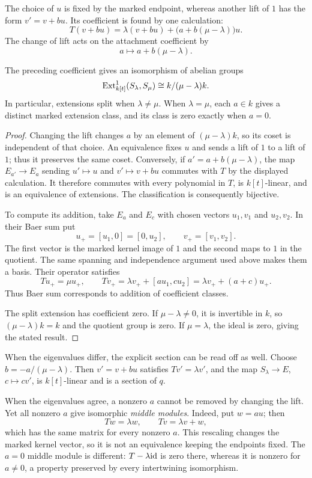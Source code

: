 The choice of $u$ is fixed by the marked endpoint, whereas another lift
of $1$ has the form $v'=v+bu$. Its coefficient is found by one calculation:
\[
T(v+bu)=\lambda(v+bu)+\bigl(a+b(\mu-\lambda)\bigr)u.
\]
The change of lift acts on the attachment coefficient by
\[
a\longmapsto a+b(\mu-\lambda).
\]

\begin{proposition}\label{x:operator-ext-classification}
The preceding coefficient gives an isomorphism of abelian groups
\[
\operatorname{Ext}^1_{k[t]}(S_\lambda,S_\mu)
 \cong k/(\mu-\lambda)k.
\]
In particular, extensions split when $\lambda\ne\mu$. When
$\lambda=\mu$, each $a\in k$ gives a distinct marked extension class,
and its class is zero exactly when $a=0$.
\end{proposition}
\begin{proof}
Changing the lift changes $a$ by an element of $(\mu-\lambda)k$, so
its coset is independent of that choice. An equivalence fixes $u$ and
sends a lift of $1$ to a lift of $1$; thus it preserves the same coset.
Conversely, if $a'=a+b(\mu-\lambda)$, the map $E_{a'}\to E_a$ sending
$u'\mapsto u$ and $v'\mapsto v+bu$ commutes with $T$ by the displayed
calculation. It therefore commutes with every polynomial in $T$, is
$k[t]$-linear, and is an equivalence of extensions. The classification
is consequently bijective.

To compute its addition, take $E_a$ and $E_c$ with chosen vectors
$u_1,v_1$ and $u_2,v_2$. In their Baer sum put
\[
u_+=[u_1,0]=[0,u_2],\qquad v_+=[v_1,v_2].
\]
The first vector is the marked kernel image of $1$ and the second maps
to $1$ in the quotient. The same spanning and independence argument
used above makes them a basis. Their operator satisfies
\[
Tu_+=\mu u_+,\qquad
Tv_+=\lambda v_++[a u_1,c u_2]
       =\lambda v_++(a+c)u_+.
\]
Thus Baer sum corresponds to addition of coefficient classes.

The split extension has coefficient zero. If $\mu-\lambda\ne0$, it
is invertible in $k$, so $(\mu-\lambda)k=k$ and the quotient group is
zero. If $\mu=\lambda$, the ideal is zero, giving the stated result.
\end{proof}

When the eigenvalues differ, the explicit section can be read off as
well. Choose $b=-a/(\mu-\lambda)$. Then $v'=v+bu$ satisfies
$Tv'=\lambda v'$, and the map $S_\lambda\to E$, $c\mapsto cv'$, is
$k[t]$-linear and is a section of $q$.

When the eigenvalues agree, a nonzero $a$ cannot be removed by changing
the lift. Yet all nonzero $a$ give isomorphic \emph{middle modules}.
Indeed, put $w=au$; then
\[
Tw=\lambda w,\qquad Tv=\lambda v+w,
\]
which has the same matrix for every nonzero $a$. This rescaling changes
the marked kernel vector, so it is not an equivalence keeping the
endpoints fixed. The $a=0$ middle module is different: $T-\lambda\mathrm{id}$
is zero there, whereas it is nonzero for $a\ne0$, a property preserved
by every intertwining isomorphism.


